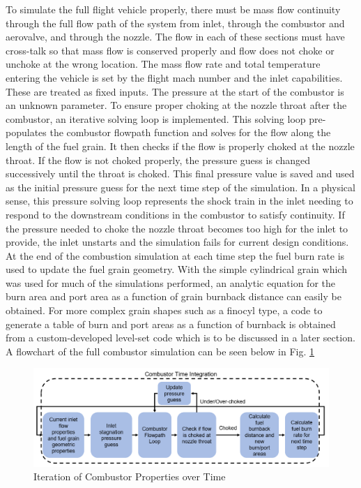 To simulate the full flight vehicle properly, there must be mass flow continuity through the full flow path of the system from inlet, through the combustor and aerovalve, and through the nozzle. The flow in each of these sections must have cross-talk so that mass flow is conserved properly and flow does not choke or unchoke at the wrong location. The mass flow rate and total temperature entering the vehicle is set by the flight mach number and the inlet capabilities. These are treated as fixed inputs. The pressure at the start of the combustor is an unknown parameter. To ensure proper choking at the nozzle throat after the combustor, an iterative solving loop is implemented. This solving loop pre-populates the combustor flowpath function and solves for the flow along the length of the fuel grain. It then checks if the flow is properly choked at the nozzle throat. If the flow is not choked properly, the pressure guess is changed successively until the throat is choked. This final pressure value is saved and used as the initial pressure guess for the next time step of the simulation. In a physical sense, this pressure solving loop represents the shock train in the inlet needing to respond to the downstream conditions in the combustor to satisfy continuity. If the pressure needed to choke the nozzle throat becomes too high for the inlet to provide, the inlet unstarts and the simulation fails for current design conditions. At the end of the combustion simulation at each time step the fuel burn rate is used to update the fuel grain geometry. With the simple cylindrical grain which was used for much of the simulations performed, an analytic equation for the burn area and port area as a function of grain burnback distance can easily be obtained. For more complex grain shapes such as a finocyl type, a code to generate a table of burn and port areas as a function of burnback is obtained from a custom-developed level-set code which is to be discussed in a later section. A flowchart of the full combustor simulation can be seen below in Fig. \ref{fig:timeloop}  \\ \indent


\begin{figure}[H]
\centering
\includegraphics[width=1\textwidth] {Combustor_Figures/timeloop.PNG}
\caption{Iteration of Combustor Properties over Time}
\label{fig:timeloop}
\end{figure}


